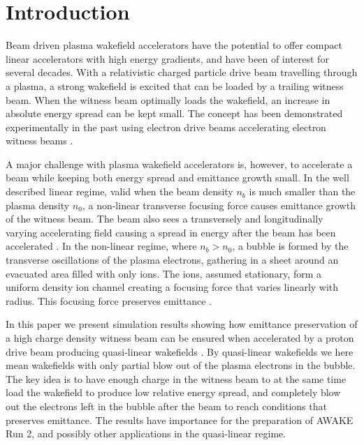 \documentclass[aps,prstab,reprint,amsmath,amssymb,groupedaddress]{revtex4-1}
\begin{document}
\maketitle

\section{Introduction}\label{S:I}

Beam driven plasma wakefield accelerators \cite{chen:1985} have the potential to offer compact linear accelerators with
high energy gradients, and have been of interest for several decades. With a relativistic charged particle drive beam
travelling through a plasma, a strong wakefield is excited that can be loaded by a trailing witness beam. When the
witness beam optimally loads the wakefield, an increase in absolute energy spread can be kept small. The concept has
been demonstrated experimentally in the past using electron drive beams accelerating electron witness beams
\cite{rosenzweig:1988, blumenfeld:2007, kallos:2008, litos:2014}. 

A major challenge with plasma wakefield accelerators is, however, to accelerate a beam while keeping both energy spread
and emittance growth small. In the well described linear regime, valid when the beam density $n_{b}$ is much smaller
than the plasma density $n_{0}$, a non-linear transverse focusing force causes emittance growth of the witness beam.
The beam also sees a transversely and longitudinally varying accelerating field causing a spread in energy after the
beam has been accelerated \cite{katsouleas:1987}. In the non-linear regime, where $n_{b} > n_{0}$, a bubble is formed by
the transverse oscillations of the plasma electrons, gathering in a sheet around an evacuated area filled with only
ions. The ions, assumed stationary, form a uniform density ion channel creating a focusing force that varies linearly
with radius. This focusing force preserves emittance \cite{rosenzweig:1991}.

In this paper we present simulation results showing how emittance preservation of a high charge density witness beam can
be ensured when accelerated by a proton drive beam producing quasi-linear wakefields \cite{rosenzweig:2010}. By
quasi-linear wakefields we here mean wakefields with only partial blow out of the plasma electrons in the bubble.
The key idea is to have enough charge in the witness beam to at the same time load the wakefield to produce low relative
energy spread, and completely blow out the electrons left in the bubble after the beam to reach conditions that
preserves emittance. The results have importance for the preparation of AWAKE Run 2, and possibly other applications in
the quasi-linear regime.
\end{document}
